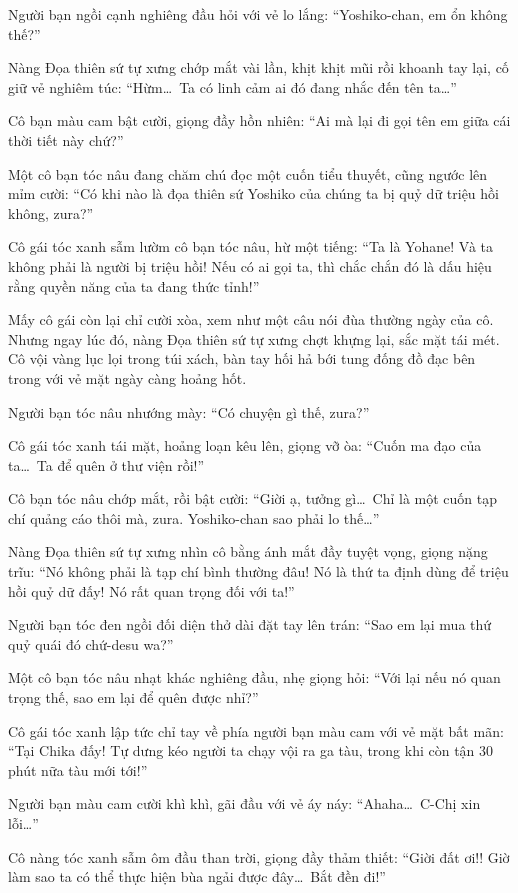 \documentclass[../main.tex]{subfiles}
\begin{document}
Người bạn ngồi cạnh nghiêng đầu hỏi với vẻ lo lắng: ``Yoshiko-chan, em ổn không thế?''

Nàng Đọa thiên sứ tự xưng chớp mắt vài lần, khịt khịt mũi rồi khoanh tay lại, cố giữ vẻ nghiêm túc: ``Hừm\dots\ Ta có linh cảm ai đó đang nhắc đến tên ta\dots''

Cô bạn màu cam bật cười, giọng đầy hồn nhiên: ``Ai mà lại đi gọi tên em giữa cái thời tiết này chứ?''

Một cô bạn tóc nâu đang chăm chú đọc một cuốn tiểu thuyết, cũng ngước lên mỉm cười: ``Có khi nào là đọa thiên sứ Yoshiko của chúng ta bị quỷ dữ triệu hồi không, zura?''

Cô gái tóc xanh sẫm lườm cô bạn tóc nâu, hừ một tiếng: ``Ta là Yohane! Và ta không phải là người bị triệu hồi! Nếu có ai gọi ta, thì chắc chắn đó là dấu hiệu rằng quyền năng của ta đang thức tỉnh!''

Mấy cô gái còn lại chỉ cười xòa, xem như một câu nói đùa thường ngày của cô. Nhưng ngay lúc đó, nàng Đọa thiên sứ tự xưng chợt khựng lại, sắc mặt tái mét. Cô vội vàng lục lọi trong túi xách, bàn tay hối hả bới tung đống đồ đạc bên trong với vẻ mặt ngày càng hoảng hốt.

Người bạn tóc nâu nhướng mày: ``Có chuyện gì thế, zura?''

Cô gái tóc xanh tái mặt, hoảng loạn kêu lên, giọng vỡ òa: ``Cuốn ma đạo của ta\dots\ Ta để quên ở thư viện rồi!''

Cô bạn tóc nâu chớp mắt, rồi bật cười: ``Giời ạ, tưởng gì\dots\ Chỉ là một cuốn tạp chí quảng cáo thôi mà, zura. Yoshiko-chan sao phải lo thế\dots''

Nàng Đọa thiên sứ tự xưng nhìn cô bằng ánh mắt đầy tuyệt vọng, giọng nặng trĩu: ``Nó không phải là tạp chí bình thường đâu! Nó là thứ ta định dùng để triệu hồi quỷ dữ đấy! Nó rất quan trọng đối với ta!''

Người bạn tóc đen ngồi đối diện thở dài đặt tay lên trán: ``Sao em lại mua thứ quỷ quái đó chứ-desu wa?''

Một cô bạn tóc nâu nhạt khác nghiêng đầu, nhẹ giọng hỏi: ``Với lại nếu nó quan trọng thế, sao em lại để quên được nhỉ?''

Cô gái tóc xanh lập tức chỉ tay về phía người bạn màu cam với vẻ mặt bất mãn: ``Tại Chika đấy! Tự dưng kéo người ta chạy vội ra ga tàu, trong khi còn tận 30 phút nữa tàu mới tới!''

Người bạn màu cam cười khì khì, gãi đầu với vẻ áy náy: ``Ahaha\dots\ C-Chị xin lỗi\dots''

Cô nàng tóc xanh sẫm ôm đầu than trời, giọng đầy thảm thiết: ``Giời đất ơi!! Giờ làm sao ta có thể thực hiện bùa ngải được đây\dots\ Bắt đền đi!''
\end{document}
